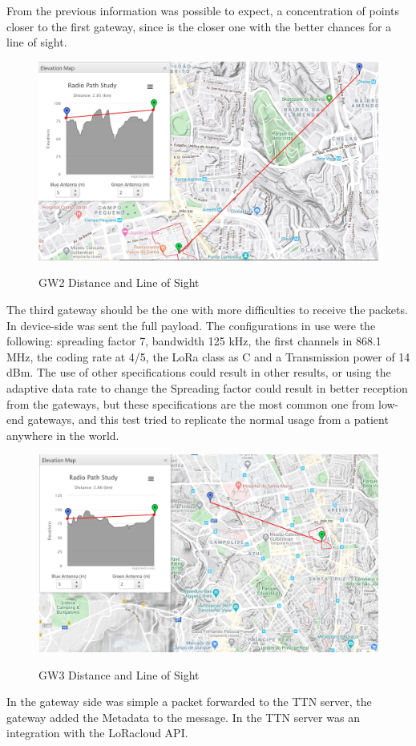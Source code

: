 From the previous information was possible to expect, a concentration of points closer to the first gateway, since is the closer one with the better chances for a line of sight. 
\begin{figure}[htbp]
  \centering
      {\includegraphics[width=0.7\linewidth]{Chapters/Figures/GW2.JPG}}%
  \caption{GW2 Distance and Line of Sight}
    \label{fig:GW2LOS}
\end{figure}

The third gateway should be the one with more difficulties to receive the packets. In device-side was sent the full payload. The configurations in use were the following: spreading factor 7, bandwidth 125 kHz, the first channels in 868.1 MHz, the coding rate at 4/5, the LoRa class as C and a Transmission power of 14 dBm. The use of  other specifications could result in other results, or using the adaptive data rate to change the Spreading factor could result in better reception from the gateways, but these specifications are the most common one from low-end gateways, and this test tried to replicate the normal usage from a patient anywhere in the world.

\begin{figure}[htbp]
  \centering
 {\includegraphics[width=0.7\linewidth]{Chapters/Figures/GW3.JPG}}%
   \caption{GW3 Distance and Line of Sight}
  \label{fig:GW3LOS}
\end{figure}

In the gateway side was simple a packet forwarded to the TTN server, the gateway added the Metadata to the message. In the TTN server was an integration with the LoRacloud API.
  
